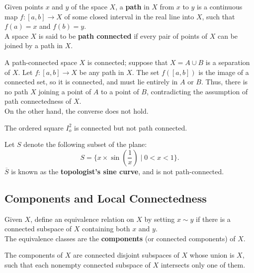 \begin{definition}
Given points $x$ and $y$ of the space $X$, a \textbf{path} in $X$ from $x$ to $y$
is a continuous map $f\colon [a, b] \rightarrow X$ of some closed interval in the real line into $X$, such
that $f(a) = x$ and $f(b) = y$. \\

A space $X$ is said to be \textbf{path connected} if every pair of points of $X$ can be joined by a path in $X$.
\end{definition}

\begin{remark}
A path-connected space $X$ is connected; suppose that $X = A \cup B$ is a separation of $X$. Let $f\colon [a, b] \rightarrow X$ be any path in $X$. 
The set $f([a, b])$ is the image of a connected set, so it is connected, and must lie entirely in $A$ or $B$. Thus, there is no path $X$
joining a point of $A$ to a point of $B$, contradicting the assumption of path connectedness of $X$. \\

On the other hand, the converse does not hold.
\end{remark}

\begin{eg}
The ordered square $I_o^2$ is connected but not path connected.
\end{eg} 
\vspace{1cm}
\begin{eg}
Let $S$ denote the following subset of the plane:
\[
    S = \{ x \times \sin \left( \frac{1}{x} \right) \mid 0 < x < 1\}. 
\]
$\overline{S}$ is known as the \textbf{topologist's sine curve}, and is not path-connected.
\end{eg}

\subsection{Components and Local Connectedness}

\begin{definition}[Components]
Given $X$, define an equivalence relation on $X$ by setting $x \sim y$ if there is a connected subspace of $X$ containing both $x$ and $y$. \\

The equivalence classes are the \textbf{components} (or connected components) of $X$.
\end{definition}

\begin{theorem}
The components of $X$ are connected disjoint subspaces of $X$ whose union is $X$, such that each nonempty connected subspace of $X$ intersects only one of them.
\end{theorem}

